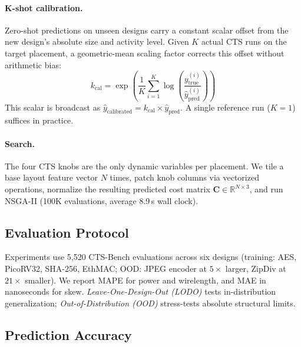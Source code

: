 \documentclass[acmsmall,review,anonymous]{acmart}
\begin{document}
\paragraph{K-shot calibration.}
\label{sec:kshot}
Zero-shot predictions on unseen designs carry a constant scalar offset from
the new design's absolute size and activity level.
Given $K$ actual CTS runs on the target placement, a geometric-mean scaling
factor corrects this offset without arithmetic bias:
\begin{equation}
  k_\text{cal} = \exp\!\left(\frac{1}{K}\sum_{i=1}^{K}
    \log\!\left(\frac{y_\text{true}^{(i)}}{\hat{y}_\text{pred}^{(i)}}\right)\right)
\end{equation}
This scalar is broadcast as $\hat{y}_\text{calibrated} = k_\text{cal}\times\hat{y}_\text{pred}$.
A single reference run ($K{=}1$) suffices in practice.

\paragraph{Search.}
The four CTS knobs are the only dynamic variables per placement.
We tile a base layout feature vector $N$ times, patch knob columns via
vectorized operations, normalize the resulting predicted cost matrix
$\mathbf{C}\in\mathbb{R}^{N\times 3}$, and run NSGA-II
(100K evaluations, average 8.9\,s wall clock).

\subsection{Evaluation Protocol}

Experiments use 5,520 CTS-Bench evaluations across six designs (training:
AES, PicoRV32, SHA-256, EthMAC; OOD: JPEG encoder at $5\times$ larger,
ZipDiv at $21\times$ smaller).
We report MAPE for power and wirelength, and MAE in nanoseconds for skew.
\textit{Leave-One-Design-Out (LODO)} tests in-distribution generalization;
\textit{Out-of-Distribution (OOD)} stress-tests absolute structural limits.

\subsection{Prediction Accuracy}
\end{document}
